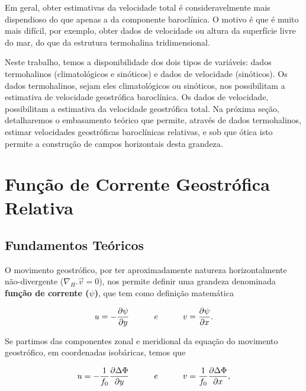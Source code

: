 Em geral, obter estimativas da velocidade total é consideravelmente mais dispendioso do que 
apenas a da componente baroclínica. O motivo é que é muito mais difícil, por exemplo, obter
dados de velocidade ou altura da superfície livre do mar, do que da estrutura termohalina
tridimensional. 

Neste trabalho, temos a disponibilidade dos dois tipos de variáveis: dados termohalinos
(climatológicos e sinóticos) e dados de velocidade (sinóticos). Os dados termohalinos, 
sejam eles climatológicos ou sinóticos, nos possibilitam a estimativa de velocidade 
geostrófica baroclínica. Os dados de velocidade, possibilitam a estimativa da velocidade
geostrófica total. Na próxima
seção, detalharemos o embasamento teórico que permite, através de dados termohalinos, 
estimar velocidades geostróficas baroclínicas relativas, e sob que ótica isto permite
a construção de campos horizontais desta grandeza.    

\section{Função de Corrente Geostrófica Relativa} \label{sec:psigeo}

\subsection{Fundamentos Teóricos} \label{sec:psigeo_teo}

\hspace{6mm} O movimento geostrófico, por ter aproximadamente natureza 
horizontalmente não-divergente ($\nabla_H . \vec{v} = 0$), nos permite definir uma grandeza 
denominada {\bf função de corrente ($\psi$)}, que tem como
definição matemática

\begin{equation}
u = -\frac{\partial \psi}{\partial y} \ \ \ \ \ \ \ \ \  e  \ \ \ \ \ \ \ \ \  v = \frac{\partial \psi}{\partial x}.
\vspace{0.5cm}
\label{eq:uvpsi}
\end{equation}

Se partimos das componentes zonal e meridional da equação do movimento geostrófico,
em coordenadas isobáricas, temos que 

\begin{equation}
u = -\frac{1}{f_0} \frac{\partial \Delta \Phi}{\partial y} \ \ \ \ \ \ \ \ \  e  \ \ \ \ \ \ \ \ \  v = \frac{1}{f_0} \frac{\partial \Delta \Phi}{\partial x},
\vspace{0.5cm}
\label{eq:uvgpan}
\end{equation}
 
